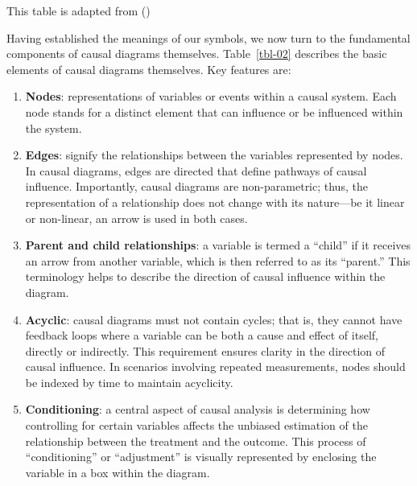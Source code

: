 \documentclass[
  singlecolumn]{article}
\begin{document}
\begin{table}

\caption{\label{tbl-03}This table is adapted from
()}

\centering{

\terminologydirectedgraph

}

\end{table}%

Having established the meanings of our symbols, we now turn to the
fundamental components of causal diagrams themselves. Table~\ref{tbl-02}
describes the basic elements of causal diagrams themselves. Key features
are:

\begin{enumerate}
\def\labelenumi{\arabic{enumi}.}
\item
  \textbf{Nodes}: representations of variables or events within a causal
  system. Each node stands for a distinct element that can influence or
  be influenced within the system.
\item
  \textbf{Edges}: signify the relationships between the variables
  represented by nodes. In causal diagrams, edges are directed that
  define pathways of causal influence. Importantly, causal diagrams are
  non-parametric; thus, the representation of a relationship does not
  change with its nature---be it linear or non-linear, an arrow is used
  in both cases.
\item
  \textbf{Parent and child relationships}: a variable is termed a
  ``child'' if it receives an arrow from another variable, which is then
  referred to as its ``parent.'' This terminology helps to describe the
  direction of causal influence within the diagram.
\item
  \textbf{Acyclic}: causal diagrams must not contain cycles; that is,
  they cannot have feedback loops where a variable can be both a cause
  and effect of itself, directly or indirectly. This requirement ensures
  clarity in the direction of causal influence. In scenarios involving
  repeated measurements, nodes should be indexed by time to maintain
  acyclicity.
\item
  \textbf{Conditioning}: a central aspect of causal analysis is
  determining how controlling for certain variables affects the unbiased
  estimation of the relationship between the treatment and the outcome.
  This process of ``conditioning'' or ``adjustment'' is visually
  represented by enclosing the variable in a box within the diagram.
\end{enumerate}
\end{document}
